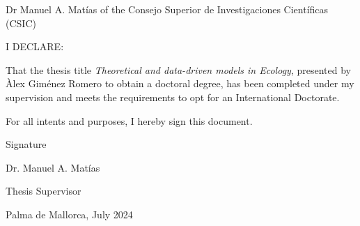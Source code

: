 \thispagestyle{empty}

Dr Manuel A. Matías of the Consejo Superior de Investigaciones
Cient\'ificas (CSIC)

\vspace*{2 cm}

I DECLARE:

\vspace*{1 cm}

That the thesis title \textit{Theoretical and data-driven models in Ecology},
presented by Àlex Giménez Romero to obtain a doctoral degree, has been
completed under my supervision and meets the requirements to opt for an
International Doctorate.

\vspace*{2 cm}

For all intents and purposes, I hereby sign this document.

\vspace*{2 cm}

Signature

\vspace*{3 cm}

Dr. Manuel A. Matías

\vspace*{0.1 cm}

Thesis Supervisor

\vspace*{1 cm}

Palma de Mallorca, July 2024

\vfill